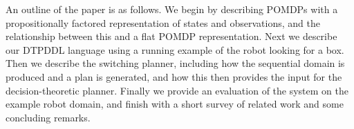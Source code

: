 
An outline of the paper is as follows. We begin by describing POMDPs with a
propositionally factored representation of states and observations,
and the relationship between this and a flat POMDP representation. Next
we describe our DTPDDL language using a running example of the robot
looking for a box. Then we describe the switching planner, including
how the sequential domain is produced and a plan is generated, and how
this then provides the input for the decision-theoretic
planner. Finally we provide an evaluation of the system on the example
robot domain, and finish with a short survey of related work and some
concluding remarks.
